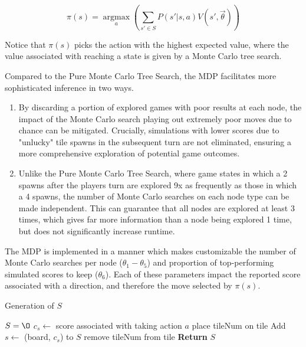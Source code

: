 \documentclass{article}
\DeclareMathOperator*{\argmax}{argmax}
\begin{document}
\begin{equation}
\label{MC12_policy_fn}
\pi(s) = \argmax\limits_{a}\left( \sum\limits_{s' \in S} P(s'|s, a)V(s', \vec{\theta}) \right)
\end{equation}


Notice that $\pi(s)$ picks the action with the highest expected value, where the value associated with reaching a state is given by a Monte Carlo tree search.


Compared to the Pure Monte Carlo Tree Search, the MDP facilitates more sophisticated inference in two ways. 

\begin{enumerate}
  \item By discarding a portion of explored games with poor results at each node, the impact of the Monte Carlo search playing out extremely poor moves due to chance can be mitigated.  Crucially, simulations with lower scores due to "unlucky" tile spawns in the subsequent turn are not eliminated, ensuring a more comprehensive exploration of potential game outcomes.
  \item Unlike the Pure Monte Carlo Tree Search, where game states in which a 2 spawns after the players turn are explored 9x as frequently as those in which a 4 spawns, the number of Monte Carlo searches on each node type can be made independent.  This can guarantee that all nodes are explored at least 3 times, which gives far more information than a node being explored 1 time, but does not significantly increase runtime.  
 
\end{enumerate}

The MDP is implemented in a manner which makes customizable the number of Monte Carlo searches per node ($\theta_1 - \theta_5$) and proportion of top-performing simulated scores to keep ($\theta_6$).  Each of these parameters impact the reported score associated with a direction, and therefore the move selected by $\pi(s)$.  


\begin{algorithm}
    \caption{Generation of $S$}
    \label{CREATE_S}
    \begin{algorithmic}[1]
    		\State $S = \O$
                \State $c_s \gets$ score associated with taking action $a$
                		\State place tileNum on tile
                		\State Add $s \gets$ (board, $c_s$) to $S$
                		\State remove tileNum from tile
                	\EndFor
                \EndFor
            \EndFor
		\State \textbf{Return }$S$
        \EndFunction
    \end{algorithmic}
\end{algorithm}
\end{document}
